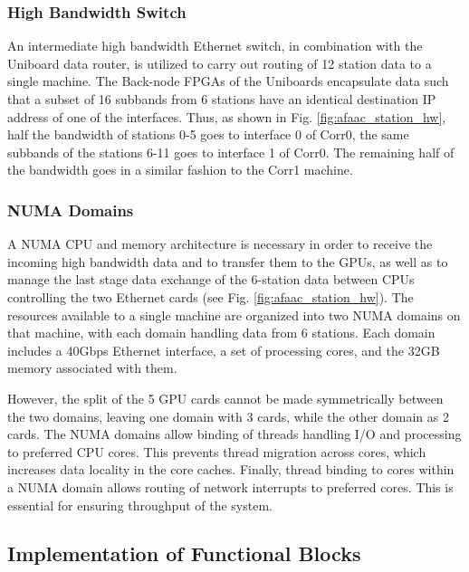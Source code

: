 \documentclass{ws-jai}
\begin{document}
\subsubsection  {High  Bandwidth  Switch}
 An  intermediate  high  bandwidth
Ethernet switch,  in combination with the  Uniboard data router, is  utilized to
carry out routing of  12 station data to a single  machine.  The Back-node FPGAs
of the  Uniboards encapsulate  data such  that a  subset of  16 subbands  from 6
stations   have  an   identical   destination   IP  address   of   one  of   the
interfaces. Thus, as  shown in Fig.  \ref{fig:afaac_station_hw},  half the bandwidth
of stations 0-5 goes to interface 0  of Corr0, the same subbands of the stations
6-11 goes to interface 1 of Corr0.   The remaining half of the bandwidth goes in
a similar fashion to the Corr1 machine.\\

\subsubsection  {NUMA  Domains}
  A  NUMA CPU  and  memory  architecture  is
necessary in order  to receive the incoming high bandwidth  data and to transfer
them to  the GPUs,  as well as  to manage  the last stage  data exchange  of the
6-station  data   between  CPUs   controlling  the   two  Ethernet   cards  (see
Fig. \ref{fig:afaac_station_hw}).  The  resources available to a  single machine are
organized into two NUMA domains on  that machine, with each domain handling data
from 6  stations. Each  domain includes  a 40Gbps Ethernet  interface, a  set of
processing cores, and the 32GB  memory associated with them.

However, the split of  the 5 GPU cards cannot be  made symmetrically between the
two domains, leaving one domain with 3 cards, while the other domain as 2 cards.
The  NUMA domains  allow  binding  of threads  handling  I/O  and processing  to
preferred  CPU  cores.   This  prevents thread  migration  across  cores,  which
increases data  locality in the core  caches.  Finally, thread binding  to cores
within a  NUMA domain allows routing  of network interrupts to  preferred cores.
This is essential for ensuring throughput of the system.

\subsection {Implementation of Functional  Blocks} 
\end{document}
